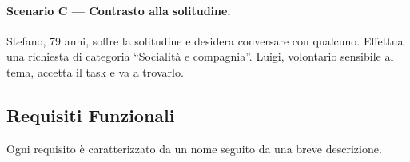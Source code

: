 \documentclass[11pt,a4paper]{article}
\begin{document}
\paragraph{Scenario C --- Contrasto alla solitudine.} Stefano, 79 anni, soffre la solitudine e desidera conversare con qualcuno. Effettua una richiesta di categoria ``Socialit\`a e compagnia''. Luigi, volontario sensibile al tema, accetta il task e va a trovarlo.

\subsection{Requisiti Funzionali}
Ogni requisito \`e caratterizzato da un nome seguito da una breve descrizione.

\newcommand{\fr}[3]{\item[\textbf{FR-#1}] \textbf{[#2]}\quad #3}
\end{document}
